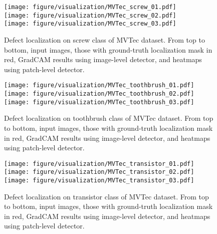\documentclass[final]{cvpr}
\begin{document}
\begin{figure}
    \centering
    \texttt{[image: figure/visualization/MVTec\_screw\_01.pdf]}\\
    \vspace{0.05in}
    \texttt{[image: figure/visualization/MVTec\_screw\_02.pdf]}\\
    \vspace{0.05in}
    \texttt{[image: figure/visualization/MVTec\_screw\_03.pdf]}
    \caption{Defect localization on screw class of MVTec dataset. From top to bottom, input images, those with ground-truth localization mask in red, GradCAM results using image-level detector, and heatmaps using patch-level detector.}
    \label{fig:heatmap_screw}
\end{figure}

\begin{figure}
    \centering
    \texttt{[image: figure/visualization/MVTec\_toothbrush\_01.pdf]}\\
    \vspace{0.05in}
    \texttt{[image: figure/visualization/MVTec\_toothbrush\_02.pdf]}\\
    \vspace{0.05in}
    \texttt{[image: figure/visualization/MVTec\_toothbrush\_03.pdf]}
    \caption{Defect localization on toothbrush class of MVTec dataset. From top to bottom, input images, those with ground-truth localization mask in red, GradCAM results using image-level detector, and heatmaps using patch-level detector.}
    \label{fig:heatmap_toothbrush}
\end{figure}

\begin{figure}
    \centering
    \texttt{[image: figure/visualization/MVTec\_transistor\_01.pdf]}\\
    \vspace{0.05in}
    \texttt{[image: figure/visualization/MVTec\_transistor\_02.pdf]}\\
    \vspace{0.05in}
    \texttt{[image: figure/visualization/MVTec\_transistor\_03.pdf]}
    \caption{Defect localization on transistor class of MVTec dataset. From top to bottom, input images, those with ground-truth localization mask in red, GradCAM results using image-level detector, and heatmaps using patch-level detector.}
    \label{fig:heatmap_transistor}
\end{figure}
\end{document}
